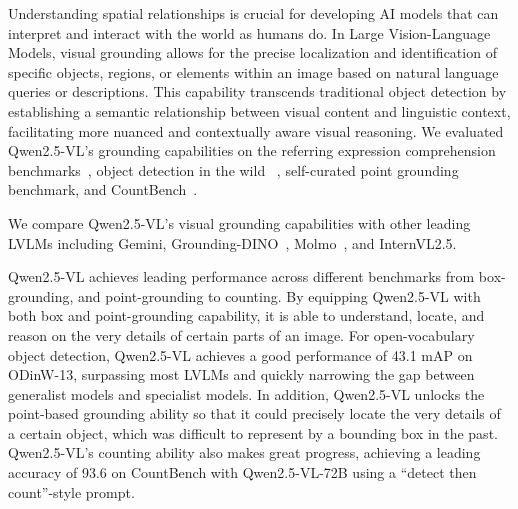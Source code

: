 Understanding spatial relationships is crucial for developing AI models that can interpret and interact with the world as humans do. In Large Vision-Language Models, visual grounding allows for the precise localization and identification of specific objects, regions, or elements within an image based on natural language queries or descriptions. This capability transcends traditional object detection by establishing a semantic relationship between visual content and linguistic context, facilitating more nuanced and contextually aware visual reasoning. 
We evaluated Qwen2.5-VL's grounding capabilities on the referring expression comprehension benchmarks~\citep{refcoco, refcocog}, object detection in the wild ~\citep{li2022grounded}, self-curated point grounding benchmark, and CountBench~\citep{paiss2023teaching}.

We compare Qwen2.5-VL's visual grounding capabilities with other leading LVLMs including Gemini, Grounding-DINO~\citep{grounding_dino}, Molmo~\citep{deitke2024molmo}, and InternVL2.5.

Qwen2.5-VL achieves leading performance across different benchmarks from box-grounding, and point-grounding to counting.
By equipping Qwen2.5-VL with both box and point-grounding capability, it is able to understand, locate, and reason on the very details of certain parts of an image. For open-vocabulary object detection, Qwen2.5-VL achieves a good performance of 43.1 mAP on ODinW-13, surpassing most LVLMs and quickly narrowing the gap between generalist models and specialist models. In addition, Qwen2.5-VL unlocks the point-based grounding ability so that it could precisely locate the very details of a certain object, which was difficult to represent by a bounding box in the past. Qwen2.5-VL's counting ability also makes great progress, achieving a leading accuracy of 93.6 on CountBench with Qwen2.5-VL-72B using a ``detect then count''-style prompt.


